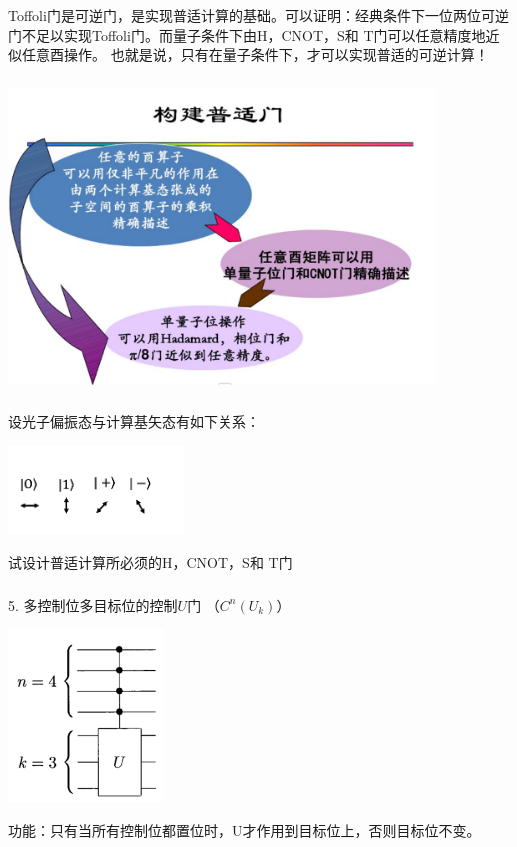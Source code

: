 \begin{frame}
    \frametitle{}
    \centering
    {Toffoli门是可逆门，是实现普适计算的基础。可以证明：经典条件下一位两位可逆门不足以实现Toffoli门。而量子条件下由H，CNOT，S和 T门可以任意精度地近似任意酉操作。
    也就是说，只有在量子条件下，才可以实现普适的可逆计算！}
\end{frame}

\begin{frame}
    \frametitle{}
    \begin{center}
        \includegraphics[width=0.85\textwidth]{figs/21.png}     
    \end{center} 
\end{frame}


\begin{frame}
    \frametitle{}
    \begin{tcolorbox3}[讨论专题]
    设光子偏振态与计算基矢态有如下关系：
    \begin{center}
        \includegraphics[width=0.35\textwidth]{figs/23.png}     
    \end{center}  
    试设计普适计算所必须的H，CNOT，S和 T门   
    \end{tcolorbox3}
\end{frame}

\begin{frame}
    \frametitle{}
    5.  多控制位多目标位的控制$U$门 （$C^n(U_k)$） 
    \begin{center}
        \includegraphics[width=0.31\textwidth]{figs/22.png}     
    \end{center} 
   功能：只有当所有控制位都置位时，U才作用到目标位上，否则目标位不变。
\end{frame}

